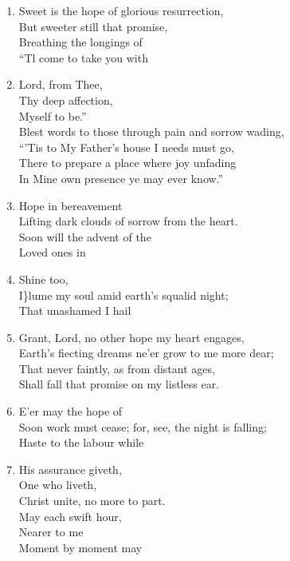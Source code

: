 \documentclass[11pt,a4paper]{article}
\begin{document}
\begin{enumerate}
    \item Sweet is the hope of glorious resurrection, \\
        But sweeter still that promise, \\
        Breathing the longings of \\
        ``Tl come to take you with

    \item Lord, from Thee, \\
        Thy deep affection, \\
        Myself to be.'' \\
        Blest words to those through pain and sorrow wading, \\
        ``'Tis to My Father's house I needs must go, \\
        There to prepare a place where joy unfading \\
        In Mine own presence ye may ever know.''

    \item Hope in bereavement \\
        Lifting dark clouds of sorrow from the heart. \\
        Soon will the advent of the \\
        Loved ones in

    \item Shine too, \\
        I\}lume my soul amid earth's squalid night; \\
        That unashamed I hail

    \item Grant, Lord, no other hope my heart engages, \\
        Earth's fiecting dreams ne'er grow to me more dear; \\
        That never faintly, as from distant ages, \\
        Shall fall that promise on my listless ear.

    \item E'er may the hope of \\
        Soon work must cease; for, see, the night is falling; \\
        Haste to the labour while

    \item His assurance giveth, \\
        One who liveth, \\
        Christ unite, no more to part. \\
        May each swift hour, \\
        Nearer to me \\
        Moment by moment may


\end{enumerate}
\end{document}
